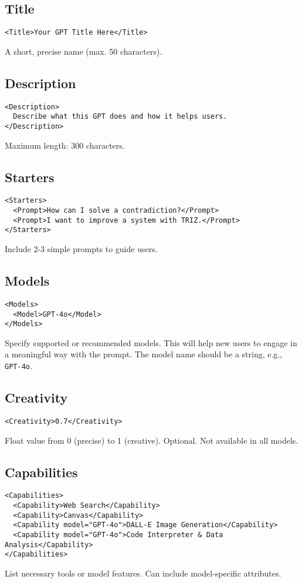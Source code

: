 \documentclass[a4paper,11pt]{refart}
\begin{document}
\subsection{Title}
\begin{lstlisting}
<Title>Your GPT Title Here</Title>
\end{lstlisting}
A short, precise name (max. 50 characters).

\subsection{Description}
\begin{lstlisting}
<Description>
  Describe what this GPT does and how it helps users.
</Description>
\end{lstlisting}
Maximum length: 300 characters.

\subsection{Starters}
\begin{lstlisting}
<Starters>
  <Prompt>How can I solve a contradiction?</Prompt>
  <Prompt>I want to improve a system with TRIZ.</Prompt>
</Starters>
\end{lstlisting}
Include 2-3 simple prompts to guide users.

\subsection{Models}
\begin{lstlisting}
<Models>
  <Model>GPT-4o</Model>
</Models>
\end{lstlisting}
Specify supported or recommended models. This will help new users to engage in a meaningful way with the prompt. The model name should be a string, e.g., \texttt{GPT-4o}.

\subsection{Creativity}
\begin{lstlisting}
<Creativity>0.7</Creativity>
\end{lstlisting}
Float value from 0 (precise) to 1 (creative). Optional. Not available in all models.

\subsection{Capabilities}
\begin{lstlisting}
<Capabilities>
  <Capability>Web Search</Capability>
  <Capability>Canvas</Capability>
  <Capability model="GPT-4o">DALL-E Image Generation</Capability>
  <Capability model="GPT-4o">Code Interpreter & Data Analysis</Capability>
</Capabilities>
\end{lstlisting}
List necessary tools or model features. Can include model-specific attributes.
\end{document}

